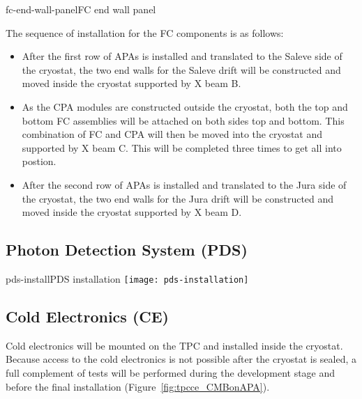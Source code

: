 \begin{cdrfigure}{fc-end-wall-panel}{FC end wall panel }
\end{cdrfigure}

The sequence of installation for the FC components is as follows:
\begin{itemize}
\item After the first row of APAs is installed and translated to the Saleve side of the cryostat, the two end walls for the Saleve drift will be constructed and moved inside the cryostat supported by X beam B.  
\item As the CPA modules are constructed outside the cryostat, both the top and bottom FC assemblies will be attached on both sides top and bottom.  This combination of FC and CPA will then be moved into the cryostat and supported by X beam C.  This will be completed three times to get all into postion.
\item After the second row of APAs is installed and translated to the Jura side of the cryostat, the two end walls for the Jura drift will be constructed and moved inside the cryostat supported by X beam D.  
\end{itemize}


\subsection{Photon Detection System (PDS)}


\begin{cdrfigure}{pds-install}{PDS installation}
\texttt{[image: pds-installation]}
\end{cdrfigure}



\subsection{Cold Electronics (CE)}
\label{subsec:ce_install}

Cold electronics will be mounted on the TPC and installed inside the cryostat.
Because access to the cold electronics is not possible after the cryostat is sealed,
a full complement of tests will be performed during the development stage and before the final installation
(Figure~\ref{fig:tpcce_CMBonAPA}).

